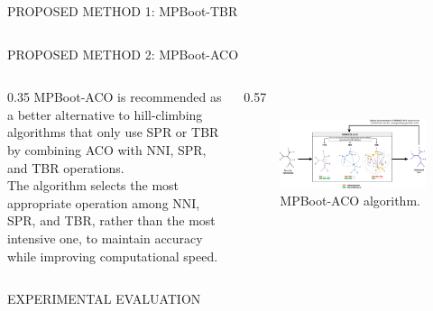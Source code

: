\documentclass[%
  final,%
  english,%
]{beamer}
\begin{document}
\begin{frame}[t, fragile = singleslide]
\begin{columns}[t, onlytextwidth]
\begin{column}{\textwidth}
\begin{block}{PROPOSED METHOD 1: MPBoot-TBR}
\begin{columns}
\end{columns}
\end{block}

\begin{block}{PROPOSED METHOD 2: MPBoot-ACO}
\begin{columns}
\begin{column} {0.35\textwidth}
MPBoot-ACO is recommended as a better alternative to hill-climbing algorithms that only use SPR or TBR by combining ACO with NNI, SPR, and TBR operations. \\ 
\vspace{0.7cm}
The algorithm selects the most appropriate operation among NNI, SPR, and TBR, rather than the most intensive one, to maintain accuracy while improving computational speed. 
\end{column}
\begin{column} {0.57\textwidth}
\begin{figure}
\centering%
\includegraphics[width = 0.98\columnwidth]{./Figuras/MPBoot-ACO.drawio.png}
\caption{MPBoot-ACO algorithm.}%
\end{figure}
\end{column}
\end{columns}
\end{block}
\end{column}
\end{columns}

\begin{columns}[t, onlytextwidth]
%
\begin{column}{\textwidth}
%
\begin{block}{EXPERIMENTAL EVALUATION}
\begin{columns}

\begin{column}{0.48\textwidth}
\begin{itemize}


\end{itemize}
\end{column}
\end{columns}
\end{block}
\end{column}
\end{columns}
\end{frame}
\end{document}
